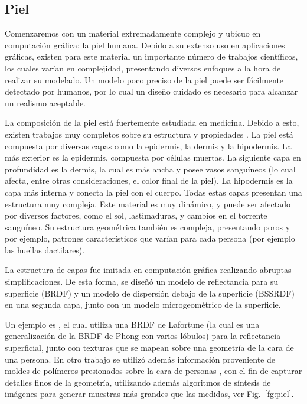 \subsection{Piel}
Comenzaremos con un material extremadamente complejo y ubicuo en computación gráfica: la piel humana.
Debido a su extenso uso en aplicaciones gráficas, existen para este material un importante número de trabajos científicos, los cuales varían en complejidad, presentando diversos enfoques a la hora de realizar su modelado.
Un modelo poco preciso de la piel puede ser fácilmente detectado por humanos, por lo cual un diseño cuidado es necesario para alcanzar un realismo aceptable.


La composición de la piel está fuertemente estudiada en medicina.
Debido a esto, existen trabajos muy completos sobre su estructura y propiedades \cite{Walters2002}.
La piel está compuesta por diversas capas como la epidermis, la dermis y la hipodermis.
La más exterior es la epidermis, compuesta por células muertas.
La siguiente capa en profundidad es la dermis, la cual es más ancha y posee vasos sanguíneos (lo cual afecta, entre otras consideraciones, el color final de la piel).
La hipodermis es la capa más interna y conecta la piel con el cuerpo.
Todas estas capas presentan una estructura muy compleja.
Este material es muy dinámico, y puede ser afectado por diversos factores, como el sol, lastimaduras, y cambios en el torrente sanguíneo.
Su estructura geométrica también es compleja, presentando poros y por ejemplo, patrones característicos que varían para cada persona (por ejemplo las huellas dactilares).

La estructura de capas fue imitada en computación gráfica realizando abruptas simplificaciones.
De esta forma, se diseñó un modelo de reflectancia para su superficie (BRDF) y un modelo de dispersión debajo de la superficie (\acrshort{BSSRDF}) en una segunda capa, junto con un modelo microgeométrico de la superficie.

Un ejemplo es \cite{Marschner2000}, el cual utiliza una BRDF de Lafortune (la cual es una generalización de la BRDF de Phong con varios lóbulos) para la reflectancia superficial, junto con texturas que se mapean sobre una geometría de la cara de una persona.
En otro trabajo se utilizó además información proveniente de moldes de polímeros presionados sobre la cara de personas \cite{Haro2001}, con el fin de capturar detalles finos de la geometría, utilizando además algoritmos de síntesis de imágenes para generar muestras más grandes que las medidas, ver Fig.~\ref{fg:piel}.

